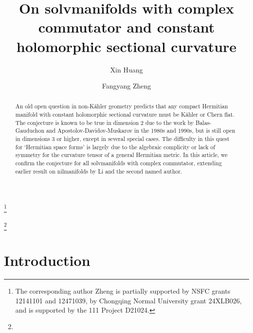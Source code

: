 \documentclass{amsart}
\begin{document}
\title[Solvmanifolds with complex commutator]{On solvmanifolds with complex commutator and constant holomorphic sectional curvature}



\author{Xin Huang}
\address{Xin Huang. School of Mathematical Sciences, Chongqing Normal University, Chongqing 401331, China}
\thanks{The corresponding author Zheng is partially supported by NSFC grants 12141101 and 12471039,  by Chongqing Normal University grant 24XLB026, and is supported by the 111 Project D21024.}
	

\author{Fangyang Zheng}
\address{Fangyang Zheng. School of Mathematical Sciences, Chongqing Normal University, Chongqing 401331, China}
 \thanks{}


\begin{abstract}
An old open question in non-K\"ahler geometry predicts that any compact Hermitian manifold with constant holomorphic sectional curvature must be K\"ahler or Chern flat.  The conjecture is known to be true in dimension $2$ due to the work by Balas-Gauduchon and Apostolov-Davidov-Muskarov in the 1980s and 1990s,  but is still open in dimensions $3$ or higher, except in several special cases. The difficulty in this quest for `Hermitian space forms' is largely due to the algebraic complicity or lack of symmetry for the curvature tensor of a general Hermitian metric. In this article, we confirm the conjecture for all solvmanifolds with complex commutator, extending earlier result on nilmanifolds by Li and the second named author. 
\end{abstract}


\maketitle


\tableofcontents




\section{Introduction}\label{intro}
\end{document}

